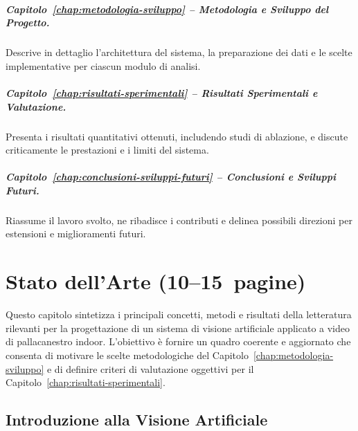 \documentclass[12pt,a4paper,openright,twoside]{book}
\begin{document}
\paragraph{Capitolo~\ref{chap:metodologia-sviluppo} -- Metodologia e Sviluppo del Progetto.} 
Descrive in dettaglio l'architettura del sistema, 
la preparazione dei dati e le scelte implementative 
per ciascun modulo di analisi.

\paragraph{Capitolo~\ref{chap:risultati-sperimentali} -- Risultati Sperimentali e Valutazione.} 
Presenta i risultati quantitativi ottenuti, includendo studi 
di ablazione, e discute criticamente le prestazioni e i limiti 
del sistema.

\paragraph{Capitolo~\ref{chap:conclusioni-sviluppi-futuri} -- Conclusioni e Sviluppi Futuri.}
Riassume il lavoro svolto, ne ribadisce i contributi e delinea 
possibili direzioni per estensioni e miglioramenti futuri.

\chapter{Stato dell'Arte (10--15~pagine)}
\label{chap:stato-dell-arte}
\noindent Questo capitolo sintetizza i principali concetti, metodi 
e risultati della letteratura rilevanti per la progettazione di un 
sistema di visione artificiale applicato a video di pallacanestro indoor.
L'obiettivo è fornire un quadro coerente e aggiornato che consenta di 
motivare le scelte metodologiche del Capitolo~\ref{chap:metodologia-sviluppo} 
e di definire criteri di valutazione oggettivi per il 
Capitolo~\ref{chap:risultati-sperimentali}.

\section{Introduzione alla Visione Artificiale}
\label{sec:introduzione-vision-artificiale}
\end{document}
